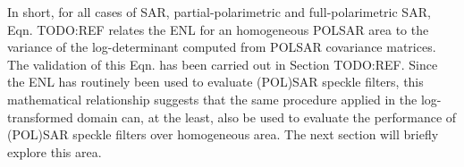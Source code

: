 In short, for all cases of SAR, partial-polarimetric and full-polarimetric SAR, Eqn. TODO:REF relates the ENL for an homogeneous POLSAR area to the variance of the log-determinant computed from POLSAR covariance matrices.
The validation of this Eqn. has been carried out in Section TODO:REF.
Since the ENL has routinely been used to evaluate (POL)SAR speckle filters, this mathematical relationship suggests that the same procedure applied in the log-transformed domain can, at the least, also be used to evaluate the performance of (POL)SAR speckle filters over homogeneous area.
The next section will briefly explore this area.

%

